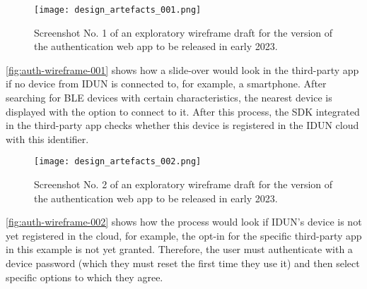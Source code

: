 \begin{figure}[ht]
  \centering
  \texttt{[image: design\_artefacts\_001.png]}
  \caption{Screenshot No. 1 of an exploratory wireframe draft for the version of the authentication web app to be released in early 2023.}
  \label{fig:auth-wireframe-001}
\end{figure}

\autoref{fig:auth-wireframe-001} shows how a slide-over would look in the third-party app if no device from IDUN is connected to, for example, a smartphone. After searching for BLE devices with certain characteristics, the nearest device is displayed with the option to connect to it. After this process, the SDK integrated in the third-party app checks whether this device is registered in the IDUN cloud with this identifier.

\begin{figure}[ht]
  \centering
  \texttt{[image: design\_artefacts\_002.png]}
  \caption{Screenshot No. 2 of an exploratory wireframe draft for the version of the authentication web app to be released in early 2023.}
  \label{fig:auth-wireframe-002}
\end{figure}

\autoref{fig:auth-wireframe-002} shows how the process would look if IDUN’s device is not yet registered in the cloud, for example, the opt-in for the specific third-party app in this example is not yet granted. Therefore, the user must authenticate with a device password (which they must reset the first time they use it) and then select specific options to which they agree.
